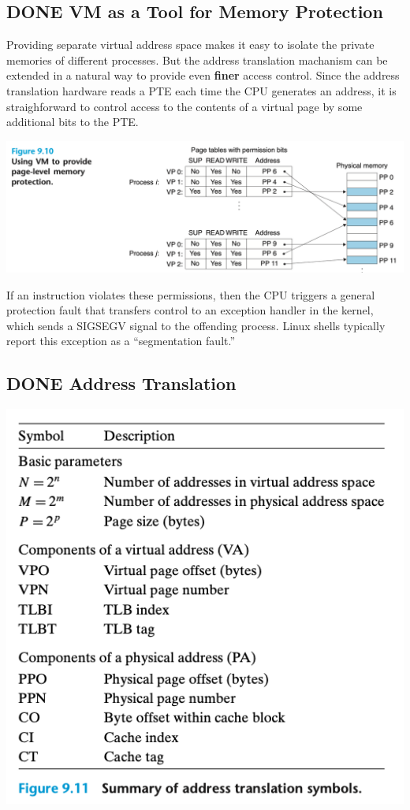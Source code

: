 \documentclass[11pt]{article}
\begin{document}
\subsection{{\bfseries\sffamily DONE} VM as a Tool for Memory Protection}
\label{sec:org1732231}
Providing separate virtual address space makes it easy to isolate the private memories of different processes. But the address translation machanism can be extended in a natural way to provide even \textbf{finer} access control. Since the address translation hardware reads a PTE each time the CPU generates an address, it is straighforward to control access to the contents of a virtual page by some additional bits to the PTE.\\

\begin{center}
\includegraphics[width=.9\linewidth]{pics/figure9.10-vm-protection.png}
\end{center}

If an instruction violates these permissions, then the CPU triggers a general protection fault that transfers control to an exception handler in the kernel, which sends a SIGSEGV signal to the offending process. Linux shells typically report this exception as a “segmentation fault.”\\


\subsection{{\bfseries\sffamily DONE} Address Translation}
\label{sec:org19a5b94}

\begin{center}
\includegraphics[width=.9\linewidth]{pics/figure9.11-vm-translation-symbols.png}
\end{center}
\end{document}
